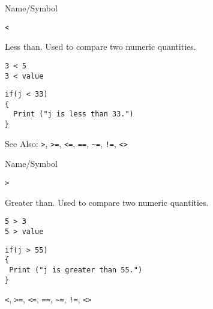 \rl

\begin{desc}{Name/Symbol}

\item[Name/Symbol] 	\verb+<+ 

\item[Description] 	Less than.  Used to compare two numeric quantities.

\item[Usage]
\begin{verbatim}
3 < 5
3 < value
\end{verbatim}
             
\item[Example]
\begin{verbatim}
if(j < 33)
{
  Print ("j is less than 33.")
}
\end{verbatim}

See Also:     	\verb+>+, \verb+>=+, \verb+<=+, \verb+==+, \verb+~=+, \verb+!=+, \verb+<>+

\end{desc}

\rl



\begin{desc}{Name/Symbol}

\item[Name/Symbol] 	\verb!>!                    

\item[Description] 	Greater than. Used to compare two numeric quantities.

\item[Usage]
\begin{verbatim}
5 > 3
5 > value
\end{verbatim}

\item[Example]
\begin{verbatim}
if(j > 55)
{
 Print ("j is greater than 55.")
}
\end{verbatim}

\item[See Also]     	\verb+<+, \verb+>=+, \verb+<=+, \verb+==+, \verb+~=+, \verb+!=+, \verb+<>+
\end{desc}

\rl


